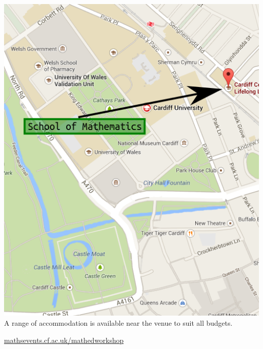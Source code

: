 \documentclass {leaflet}
\begin{document}
\begin{center}
\includegraphics[width=.8\textwidth]{./Images/map.png}\\
\footnotesize A range of accommodation is available near the venue to suit all budgets.

\vspace{1cm}
\url{mathsevents.cf.ac.uk/mathedworkshop}
\end{center}

\loggingall
\end{document}
